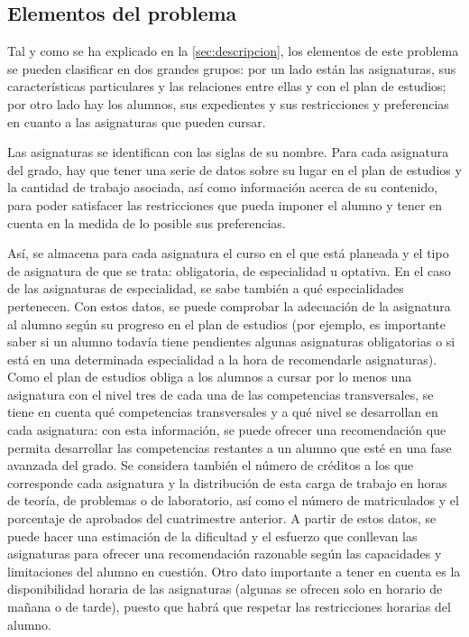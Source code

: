 
\subsection{Elementos del problema} \label{sec:elementos}

Tal y como se ha explicado en la \autoref{sec:descripcion}, los elementos de 
este problema se pueden clasificar en dos grandes grupos: por un lado están 
las asignaturas, sus características particulares y las relaciones entre ellas 
y con el plan de estudios; por otro lado hay los alumnos, sus expedientes y 
sus restricciones y preferencias en cuanto a las asignaturas que pueden 
cursar.

Las asignaturas se identifican con las siglas de su nombre. Para cada 
asignatura del grado, hay que tener una serie de datos sobre su lugar en el 
plan de estudios y la cantidad de trabajo asociada, así como información 
acerca de su contenido, para poder satisfacer las restricciones que pueda 
imponer el alumno y tener en cuenta en la medida de lo posible sus 
preferencias. 

Así, se almacena para cada asignatura el curso en el que está planeada y el 
tipo de asignatura de que se trata: obligatoria, de especialidad u optativa. 
En el caso de las asignaturas de especialidad, se sabe también a qué 
especialidades pertenecen. Con estos datos, se puede comprobar la adecuación 
de la asignatura al alumno según su progreso en el plan de estudios 
(por ejemplo, es importante saber si un alumno todavía tiene pendientes 
algunas asignaturas obligatorias o si está en una determinada especialidad a 
la hora de recomendarle asignaturas). Como el plan de estudios obliga a los 
alumnos a cursar por lo menos una asignatura con el nivel tres de cada una de 
las competencias transversales, se tiene en cuenta qué competencias 
transversales y a qué nivel se desarrollan en cada asignatura: con esta 
información, se puede ofrecer una recomendación que permita desarrollar las 
competencias restantes a un alumno que esté en una fase avanzada del grado.
Se considera también el número de créditos a los que corresponde cada 
asignatura y la distribución de esta carga de trabajo en horas de teoría, de 
problemas o de laboratorio, así como el número de matriculados y el 
porcentaje de aprobados del cuatrimestre anterior. A partir de estos datos, 
se puede hacer una estimación de la dificultad y el esfuerzo que conllevan 
las asignaturas para ofrecer una recomendación razonable según las 
capacidades y limitaciones del alumno en cuestión. Otro dato importante a 
tener en cuenta es la disponibilidad horaria de las asignaturas (algunas se 
ofrecen solo en horario de mañana o de tarde), puesto que habrá que respetar 
las restricciones horarias del alumno.


